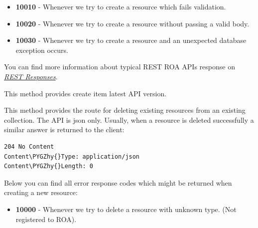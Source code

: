 \documentclass[letterpaper,10pt,english]{sphinxmanual}
\def\PYGZhy{\char`\-}
\begin{document}
\begin{fulllineitems}
\begin{fulllineitems}
\begin{itemize}
\item {} 
\textbf{10010} - Whenever we try to create a resource which fails validation.

\item {} 
\textbf{10020} - Whenever we try to create a resource without passing a valid body.

\item {} 
\textbf{10030} - Whenever we try to create a resource and an unexpected database exception occurs.

\end{itemize}

You can find more information about typical REST ROA APIs response on {\hyperref[features/roa/rest_responses::doc]{\emph{REST Responses}}}.

\end{fulllineitems}


\begin{fulllineitems}
\label{features/roa/technical_summary:fantastico.contrib.roa_discovery.roa_controller.RoaController.create_item_latest}
This method provides create item latest API version.

\end{fulllineitems}


\begin{fulllineitems}
\label{features/roa/technical_summary:fantastico.contrib.roa_discovery.roa_controller.RoaController.delete_item}
This method provides the route for deleting existing resources from an existing collection.
The API is json only. Usually, when a resource is deleted successfully a similar answer is returned to the client:

\begin{Verbatim}[commandchars=\\\{\}]
204 No Content
Content\PYGZhy{}Type: application/json
Content\PYGZhy{}Length: 0
\end{Verbatim}

Below you can find all error response codes which might be returned when creating a new resource:
\begin{itemize}
\item {} 
\textbf{10000} - Whenever we try to delete a resource with unknown type. (Not registered to ROA).


\end{itemize}
\end{fulllineitems}
\end{fulllineitems}
\end{document}
